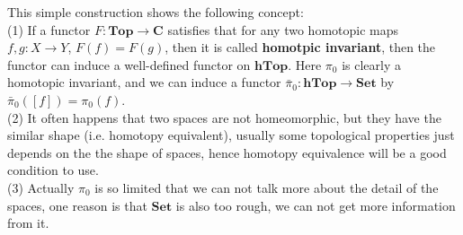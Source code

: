 \documentclass[12pt,a4paper]{article}
\begin{document}
This simple construction shows the following concept:\\

(1) If a functor \(F: \mathbf{Top} \to \mathbf{C}\) satisfies that for any two homotopic maps \(f,g:X \to Y\), \(F(f) = F(g)\), then it is called \textbf{homotpic invariant}, then the functor can induce a well-defined functor on \(\mathbf{hTop}\). Here \(\pi_0\) is clearly a homotopic invariant, and we can induce a functor \(\bar{\pi}_0: \mathbf{hTop} \to \mathbf{Set}\) by \(\bar{\pi}_0([f]) = \pi_0(f)\).\\

(2) It often happens that two spaces are not homeomorphic, but they have the similar shape (i.e. homotopy equivalent), usually some topological properties just depends on the the shape of spaces, hence homotopy equivalence will be a good condition to use.\\

(3) Actually \(\pi_0\) is so limited that we can not talk more about the detail of the spaces, one reason is that \(\mathbf{Set}\) is also too rough, we can not get more information from it.\\
\end{document}

